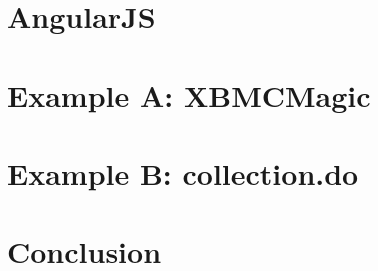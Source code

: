 

\chapter{AngularJS}






\chapter{Example A: XBMCMagic}
\label{ch:xbmc}





\chapter{Example B: collection.do}
\label{ch:collection}





\chapter{Conclusion}

